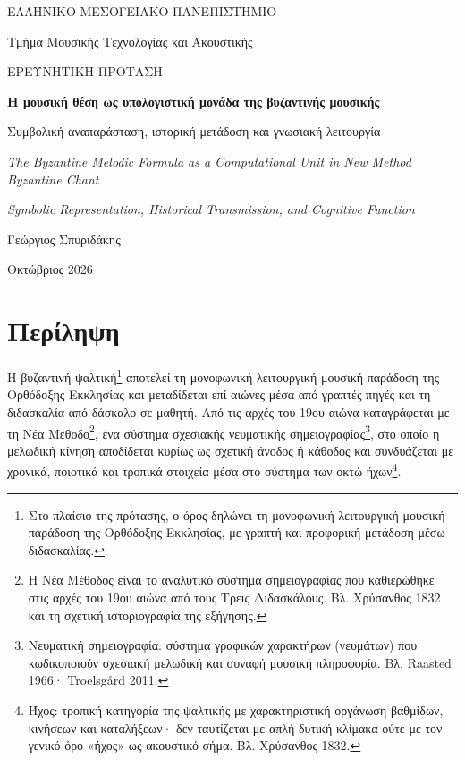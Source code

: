 \documentclass[11pt,a4paper]{article}
\begin{document}
\hypersetup{pageanchor=false}
\begin{titlepage}
\centering
\vspace*{1.0cm}
{\coverfont\large ΕΛΛΗΝΙΚΟ ΜΕΣΟΓΕΙΑΚΟ ΠΑΝΕΠΙΣΤΗΜΙΟ\par}
{\coverfont Τμήμα Μουσικής Τεχνολογίας και Ακουστικής\par}
\vspace{1.5cm}
{\coverfont\large ΕΡΕΥΝΗΤΙΚΗ ΠΡΟΤΑΣΗ\par}
\vspace{1.3cm}
{\coverfont\LARGE\bfseries Η μουσική θέση ως υπολογιστική μονάδα της βυζαντινής μουσικής\par}
\vspace{0.65cm}
{\coverfont\large Συμβολική αναπαράσταση, ιστορική μετάδοση και γνωσιακή λειτουργία\par}
\vspace{1.1cm}
{\coverfont\large\itshape The Byzantine Melodic Formula as a Computational Unit in New Method Byzantine Chant\par}
\vspace{0.3cm}
{\coverfont\normalsize\itshape Symbolic Representation, Historical Transmission, and Cognitive Function\par}
\vspace{9.8cm}
{\coverfont Γεώργιος Σπυριδάκης\par}
\vspace{0.8cm}
{\coverfont\small Οκτώβριος 2026\par}
\vfill
\end{titlepage}
\hypersetup{pageanchor=true}

\section*{Περίληψη}

Η βυζαντινή ψαλτική\footnote{Στο πλαίσιο της πρότασης, ο όρος δηλώνει τη μονοφωνική λειτουργική μουσική παράδοση της Ορθόδοξης Εκκλησίας, με γραπτή και προφορική μετάδοση μέσω διδασκαλίας.} αποτελεί τη μονοφωνική λειτουργική μουσική παράδοση της Ορθόδοξης Εκκλησίας και μεταδίδεται επί αιώνες μέσα από γραπτές πηγές και τη διδασκαλία από δάσκαλο σε μαθητή. Από τις αρχές του 19ου αιώνα καταγράφεται με τη Νέα Μέθοδο\footnote{Η Νέα Μέθοδος είναι το αναλυτικό σύστημα σημειογραφίας που καθιερώθηκε στις αρχές του 19ου αιώνα από τους Τρεις Διδασκάλους. Βλ. Χρύσανθος 1832 και τη σχετική ιστοριογραφία της εξήγησης.}, ένα σύστημα σχεσιακής νευματικής σημειογραφίας\footnote{Νευματική σημειογραφία: σύστημα γραφικών χαρακτήρων (νευμάτων) που κωδικοποιούν σχεσιακή μελωδική και συναφή μουσική πληροφορία. Βλ. Raasted 1966· Troelsgård 2011.}, στο οποίο η μελωδική κίνηση αποδίδεται κυρίως ως σχετική άνοδος ή κάθοδος και συνδυάζεται με χρονικά, ποιοτικά και τροπικά στοιχεία μέσα στο σύστημα των οκτώ ήχων\footnote{Ήχος: τροπική κατηγορία της ψαλτικής με χαρακτηριστική οργάνωση βαθμίδων, κινήσεων και καταλήξεων· δεν ταυτίζεται με απλή δυτική κλίμακα ούτε με τον γενικό όρο «ήχος» ως ακουστικό σήμα. Βλ. Χρύσανθος 1832.}.
\end{document}

